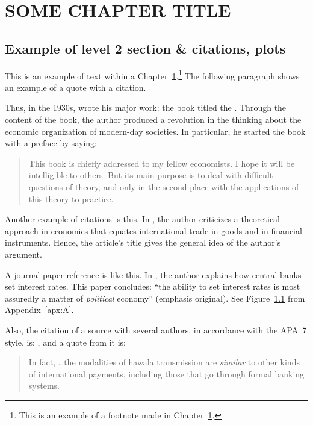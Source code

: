 %
%
%
%

\section{\MakeUppercase{Some Chapter Title}}\label{sec:ch1}

\subsection{Example of level 2 section \& citations, plots}

This is an example of text within a Chapter~\ref{sec:ch1}.\footnote{This is an example of a footnote made in Chapter~\ref{sec:ch1}.} The following paragraph shows an example of a quote with a citation.

Thus, in the 1930s, \citeauthor{book1} wrote his major work: the book titled the . Through the content of the book, the author produced a revolution in the thinking about the economic organization of modern-day societies. In particular, he started the book with a preface by saying:

\begin{quote}
    This book is chiefly addressed to my fellow economists. I hope it will be intelligible to others. But its main purpose is to deal with difficult questions of theory, and only in the second place with the applications of this theory to practice.~\parencite[p.~v]{book1}
\end{quote}

Another example of citations is this. In \textcite{article1}, the author criticizes a theoretical approach in economics that equates international trade in goods and in financial instruments. Hence, the article's title  gives the general idea of the author's argument.

A journal paper reference is like this. In \textcite{article2}, the author explains how central banks set interest rates. This paper concludes: ``the ability to set interest rates is most assuredly a matter of \textit{political} economy'' (emphasis original). See Figure~\ref{} from Appendix~\ref{apx:A}.

Also, the citation of a source with several authors, in accordance with the APA~7 style, is: \textcite{wp1}, and a quote from it is: 

\begin{quote}
    In fact, \dots the modalities of hawala transmission are \textit{similar} to other kinds of international payments, including those that go through formal banking systems. \parencite[p.~14, emphasis added]{wp1}
\end{quote}

